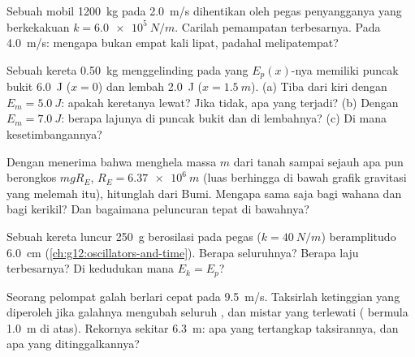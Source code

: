 \begin{exercise}[$\star\star$]\label{exo:g12:work-and-energy:11}
Sebuah mobil \qty{1200}{kg} pada \qty{2.0}{m/s} dihentikan oleh pegas penyangganya
yang berkekakuan $k = \qty{6.0e5}{N/m}$. Carilah pemampatan terbesarnya.
Pada \qty{4.0}{m/s}: mengapa bukan empat kali lipat, padahal  melipatempat?
\end{exercise}

\begin{exercise}[$\star\star\star$]\label{exo:g12:work-and-energy:12}
Sebuah kereta \qty{0.50}{kg} menggelinding pada  yang $E_p(x)$-nya memiliki
puncak bukit \qty{6.0}{J} ($x = 0$) dan lembah \qty{2.0}{J}
($x = \qty{1.5}{m}$). (a) Tiba dari kiri dengan
$E_m = \qty{5.0}{J}$: apakah keretanya lewat? Jika tidak, apa yang terjadi? (b) Dengan
$E_m = \qty{7.0}{J}$: berapa lajunya di puncak bukit dan di lembahnya? (c) Di mana kesetimbangannya?
\end{exercise}

\begin{exercise}[$\star\star\star$]\label{exo:g12:work-and-energy:13}
Dengan menerima bahwa menghela massa $m$ dari tanah sampai sejauh apa pun
berongkos $mgR_E$, $R_E = \qty{6.37e6}{m}$ (luas berhingga di bawah grafik
gravitasi yang melemah itu), hitunglah \emph{} dari Bumi.
Mengapa sama saja bagi wahana dan bagi kerikil? Dan bagaimana peluncuran tepat di bawahnya?
\end{exercise}

\begin{exercise}[$\star\star\star$]\label{exo:g12:work-and-energy:14}
Sebuah kereta luncur \qty{250}{g} berosilasi pada pegas ($k = \qty{40}{N/m}$)
beramplitudo \qty{6.0}{cm} (\cref{ch:g12:oscillators-and-time}).
Berapa  seluruhnya? Berapa laju terbesarnya? Di kedudukan mana $E_k = E_p$?
\end{exercise}

\begin{exercise}[$\star\star\star$]\label{exo:g12:work-and-energy:15}
Seorang pelompat galah berlari cepat pada \qty{9.5}{m/s}. Taksirlah ketinggian yang
diperoleh  jika galahnya mengubah seluruh , dan
mistar yang terlewati ( bermula \qty{1.0}{m} di atas). Rekornya
sekitar \qty{6.3}{m}: apa yang tertangkap taksirannya, dan apa yang ditinggalkannya?
\end{exercise}

